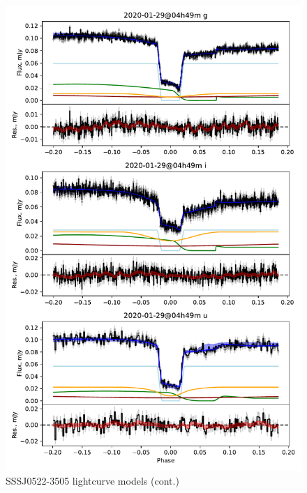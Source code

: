 \begin{figure}
    \centering
    \includegraphics[width=\textwidth]{figures/results/three_cvs_with_weird_colours/SSS111126/SSS111126_3.pdf}
    \caption{SSSJ0522-3505 lightcurve models (cont.)}
    \label{fig:SSSJ0522-3505 all lightcurves cont 2}
\end{figure}



